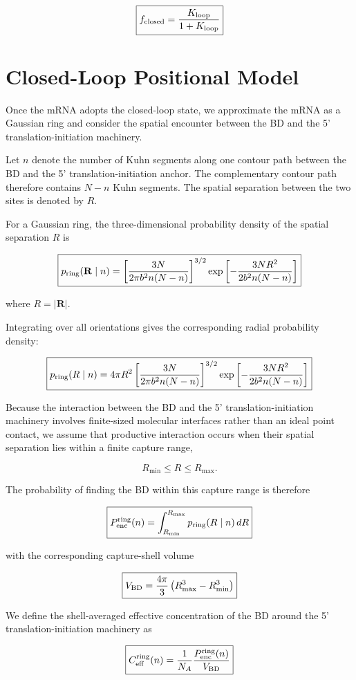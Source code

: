 \documentclass{article}
\begin{document}
\[
\boxed{
f_{\rm closed}
=
\frac{K_{\rm loop}}
{1+K_{\rm loop}}
}
\]

\section{Closed-Loop Positional Model}

Once the mRNA adopts the closed-loop state, we approximate the mRNA as a Gaussian ring and consider the spatial encounter between the BD and the 5' translation-initiation machinery.

Let \(n\) denote the number of Kuhn segments along one contour path between the BD and the 5' translation-initiation anchor. The complementary contour path therefore contains \(N-n\) Kuhn segments. The spatial separation between the two sites is denoted by \(R\).

For a Gaussian ring, the three-dimensional probability density of the spatial separation \(R\) is

\[
\boxed{
p_{\rm ring}(\mathbf R\mid n)
=
\left[
\frac{3N}
{2\pi b^2n(N-n)}
\right]^{3/2}
\exp\left[
-\frac{3NR^2}
{2b^2n(N-n)}
\right]
}
\]

where \(R=|\mathbf R|\).

Integrating over all orientations gives the corresponding radial probability density:

\[
\boxed{
p_{\rm ring}(R\mid n)
=
4\pi R^2
\left[
\frac{3N}
{2\pi b^2n(N-n)}
\right]^{3/2}
\exp\left[
-\frac{3NR^2}
{2b^2n(N-n)}
\right]
}
\]

Because the interaction between the BD and the 5' translation-initiation machinery involves finite-sized molecular interfaces rather than an ideal point contact, we assume that productive interaction occurs when their spatial separation lies within a finite capture range,

\[
R_{\min}\leq R\leq R_{\max}.
\]

The probability of finding the BD within this capture range is therefore

\[
\boxed{
P_{\rm enc}^{\rm ring}(n)
=
\int_{R_{\min}}^{R_{\max}}
p_{\rm ring}(R\mid n)\,dR
}
\]

with the corresponding capture-shell volume

\[
\boxed{
V_{\rm BD}
=
\frac{4\pi}{3}
\left(
R_{\max}^3-R_{\min}^3
\right)
}
\]

We define the shell-averaged effective concentration of the BD around the 5' translation-initiation machinery as

\[
\boxed{
C_{\rm eff}^{\rm ring}(n)
=
\frac{1}{N_A}
\frac{
P_{\rm enc}^{\rm ring}(n)
}{
V_{\rm BD}
}
}
\]
\end{document}
